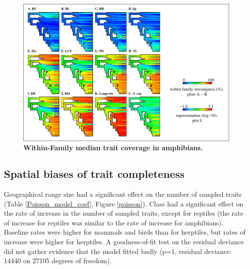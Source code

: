 \begin{figure}[h!]
\centering
\includegraphics[scale=1]{figures/chapter2/NA_phylo_patterns/Amphibians_coverage}
\caption[Within-Family median trait coverage in amphibians]{\textbf{Within-Family median trait coverage in amphibians.}}
\label{familycov_amphibians}
\end{figure}

\pagebreak


\subsection{Spatial biases of trait completeness} 
Geographical range size had a significant effect on the number of sampled traits (Table \ref{Poisson_model_coef}, Figure \ref{poisson}). Class had a significant effect on the rate of increase in the number of sampled traits, except for reptiles (the rate of increase for reptiles was similar to the rate of increase for amphibians). Baseline rates were higher for mammals and birds than for herptiles, but rates of increase were higher for herptiles.
A goodness-of-fit test on the residual deviance did not gather evidence that the model fitted badly (p=1, residual deviance: 14440 on 27105 degrees of freedom).


